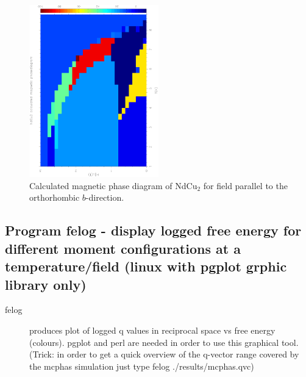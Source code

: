 \begin{figure}[hb]%
\begin{center}\leavevmode
\includegraphics[angle=-90, width=0.5\textwidth]{figsrc/ndcu2b/resultss/phased.ps}
\end{center}
\caption{Calculated magnetic phase diagram of NdCu$_2$ for field parallel to the orthorhombic $b$-direction.}
\label{phasediagramgraphic}
\end{figure}
\clearpage


\subsection{Program {\prg felog} - display logged free energy for different moment configurations %
at a temperature/field (linux with pgplot grphic library only)}

\begin{description} 
\item [felog]                  produces plot of logged q values in reciprocal
space vs free energy (colours). {\prg pgplot} and {\prg perl} are needed in order
to use this graphical tool.
(Trick: in order to get a quick overview of the
q-vector range covered by the mcphas simulation just type {\prg felog ./results/mcphas.qvc})
\end{description} 

